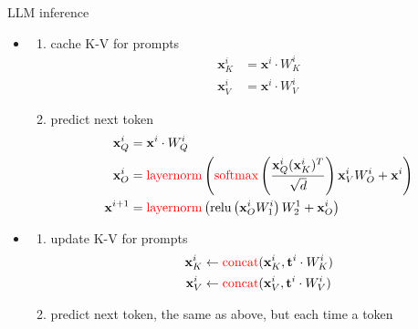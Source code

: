 \begin{frame}{LLM inference}
\footnotesize{
    \begin{itemize}
        \item[] 
            \begin{enumerate}
                \item cache K-V for prompts
                    \begin{align*}
                        \mathbf{x}_K^i &= \mathbf{x}^i \cdot W_{K}^i \\
                        \mathbf{x}_V^i &= \mathbf{x}^i \cdot W_{V}^i
                    \end{align*}
                \item predict next token
                \begin{align*}
                    \mathbf{x}_Q^i &= \mathbf{x}^i \cdot W_{Q}^i \\
                    \mathbf{x}_O^i &= \textcolor{red}{\text{layernorm}}\left(\textcolor{red}{\text{softmax}}\left(\frac{\mathbf{x}_Q^i(\mathbf{x}_K^i)^T}{\sqrt{d}}\right) \mathbf{x}_V^i W_O^i + \mathbf{x}^i\right) \\
                    \mathbf{x}^{i+1} &= \textcolor{red}{\text{layernorm}}\left(\text{relu}\left(\mathbf{x}^i_OW_1^i\right)W_2^1+\mathbf{x}_O^i\right)
                \end{align*}
            \end{enumerate}
        \item[] 
            \begin{enumerate}
                \item update K-V for prompts
                        \begin{align*}
                            \mathbf{x}_K^i&\leftarrow\textcolor{red}{\text{concat}}({\mathbf{x}_K^i}, \mathbf{t}^i\cdot W_K^i) \\
                            \mathbf{x}_V^i&\leftarrow\textcolor{red}{\text{concat}}({\mathbf{x}_V^i}, \mathbf{t}^i\cdot W_V^i) 
                        \end{align*}
                \item predict next token, the same as above, but each time a token
            \end{enumerate}
    \end{itemize}
}
\end{frame}

